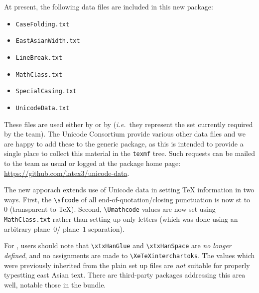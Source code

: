 \documentclass{ltnews}
\begin{document}
At present, the following data files are included in this new package:
\begin{itemize}
  \item \verb|CaseFolding.txt|
  \item \verb|EastAsianWidth.txt|
  \item \verb|LineBreak.txt|
  \item \verb|MathClass.txt|
  \item \verb|SpecialCasing.txt|
  \item \verb|UnicodeData.txt|
\end{itemize}
These files are used either by \LaTeXe{} or by 
(\emph{i.e.}~they represent the set currently required by the team). The
Unicode Consortium provide various other data files and we are happy to add
these to the generic package, as this is intended to provide a single place
to collect this material in the \verb|texmf| tree. Such requests can be
mailed to the team as usual or logged at the package home page:
\url{https://github.com/latex3/unicode-data}.

The new apporach extends use of Unicode data in setting \TeX{} information
in two ways. First, the \verb|\sfcode| of all end-of-quotation/closing
punctuation is now st to $0$ (transparent to \TeX{}). Second, \verb|\Umathcode|
values are now set using \verb|MathClass.txt| rather than setting up only
letters (which was done using an arbitrary plane~$0$/ plane~$1$ separation).

For , users should note that \verb|\xtxHanGlue| and
\verb|\xtxHanSpace| are \emph{no longer defined}, and no assignments are made
to \verb|\XeTeXinterchartoks|. The values which were previously inherited from
the plain  set up files are \emph{not} suitable for properly
typestting east Asian text. There are third-party packages addressing this
area well, notable those in the  bundle.
\end{document}
